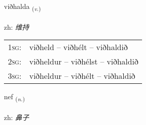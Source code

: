 \documentclass[frontgrid, backgrid]{flacards}\usepackage[]{graphicx}\usepackage[]{color}
\begin{document}
\renewcommand{\blhead}{\vskip5pt {\small\bfseries\footnotesize Sagnorð | 动词 }}
\renewcommand{\bcfoot}{\vskip5pt \hspace{2pt}{\small\bfseries\footnotesize 2K}}


{viðhalda \small{\textsubscript{(\textit{v.})}} \\[1ex] %
\textphonetic{[vɪθhalta]} \\
zh: \emph{维持} \\  [2ex]
\renewcommand*{\arraystretch}{0.8}
\begin{tabular}{p{1cm}l}
\textsc{1sg}: & viðheld -- viðhélt -- viðhaldið \\ 
\textsc{2sg}: & viðheldur -- viðhélst -- viðhaldið \\ 
\textsc{3sg}: & viðheldur -- viðhélt -- viðhaldið \\ 
\end{tabular}
}

\renewcommand{\flhead}{\vskip5pt \fboxsep=0pt {\small\bfseries\footnotesize Nafnorð | 名词}}
\renewcommand{\fcfoot}{\vskip5pt \fboxsep=0pt \hspace{2pt}{\small\bfseries\footnotesize 2K}}

\renewcommand{\blhead}{\vskip5pt {\small\bfseries\footnotesize Nafnorð | 名词 }}
\renewcommand{\bcfoot}{\vskip5pt \hspace{2pt}{\small\bfseries\footnotesize 2K}}


{nef \small{\textsubscript{(\textit{n.})}} \\[1ex] %
\textphonetic{[nɛːv]} \\
zh: \emph{鼻子} \\  [2ex]
\renewcommand*{\arraystretch}{0.8}
}

\renewcommand{\flhead}{\vskip5pt \fboxsep=0pt {\small\bfseries\footnotesize Nafnorð | 名词}}
\renewcommand{\fcfoot}{\vskip5pt \fboxsep=0pt \hspace{2pt}{\small\bfseries\footnotesize 2K}}
\end{document}
